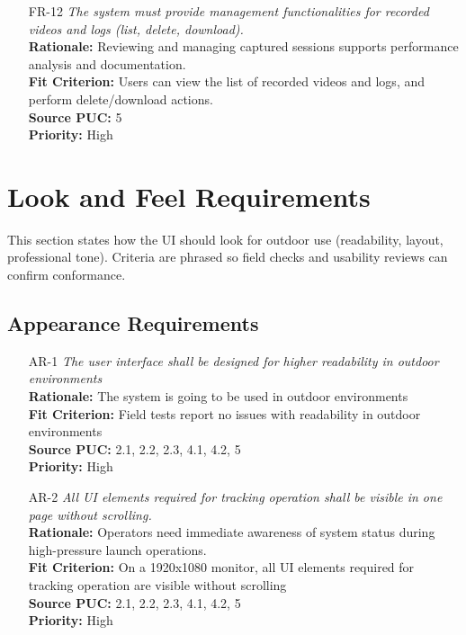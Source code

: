 \documentclass[12pt]{article}
\begin{document}
\begin{itemize}[leftmargin=*]
  \item[FR-12] \emph{The system must provide management functionalities for recorded
          videos and logs (list, delete, download).}\\[2mm]
        \textbf{Rationale:} Reviewing and managing captured sessions supports performance analysis and documentation.\\
        \textbf{Fit Criterion:} Users can view the list of recorded videos and logs, and perform delete/download actions.\\
        \textbf{Source PUC:} 5 \\
        \textbf{Priority:} High

\end{itemize}
\section{Look and Feel Requirements}
This section states how the UI should look for outdoor use (readability,
layout, professional tone). Criteria are phrased so field checks and usability
reviews can confirm conformance.
\subsection{Appearance Requirements}
\begin{itemize}[leftmargin=*]
  \item[AR-1] \emph{The user interface shall be designed for higher readability in
          outdoor environments}\\[2mm]
        \textbf{Rationale:} The system is going to be used in outdoor environments\\
        \textbf{Fit Criterion:} Field tests report no issues with readability in outdoor environments\\
        \textbf{Source PUC:} 2.1, 2.2, 2.3, 4.1, 4.2, 5 \\
        \textbf{Priority:} High

  \item[AR-2] \emph{All UI elements required for tracking operation shall be visible in
          one page without scrolling.}\\[2mm]
        \textbf{Rationale:} Operators need immediate awareness of system
        status during high-pressure launch operations.\\
        \textbf{Fit Criterion:} On a 1920x1080 monitor, all UI elements required for tracking operation are visible without scrolling\\
        \textbf{Source PUC:} 2.1, 2.2, 2.3, 4.1, 4.2, 5 \\
        \textbf{Priority:} High
\end{itemize}
\end{document}
